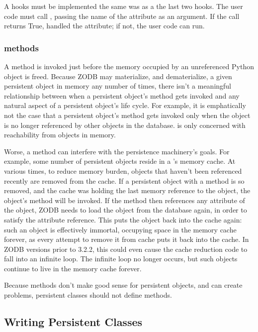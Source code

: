 A  hooks must be implemented the same was as a the
last two hooks.  The user code must call , passing
the name of the attribute as an argument.  If the call returns True,
 handled the attribute; if not, the user code can
run.

\subsubsection{ methods}

A  method is invoked just before the memory occupied by an
unreferenced Python object is freed.  Because ZODB may materialize, and
dematerialize, a given persistent object in memory any number of times,
there isn't a meaningful relationship between when a persistent object's
 method gets invoked and any natural aspect of a
persistent object's life cycle.  For example, it is emphatically not the
case that a persistent object's  method gets invoked only
when the object is no longer referenced by other objects in the database.
 is only concerned with reachability from objects in
memory.

Worse, a  method can interfere with the persistence
machinery's goals.  For example, some number of persistent objects reside
in a 's memory cache.  At various times, to reduce memory
burden, objects that haven't been referenced recently are removed from the
cache.  If a persistent object with a  method is so
removed, and the cache was holding the last memory reference to the object,
the object's  method will be invoked.  If the
 method then references any attribute of the object, ZODB
needs to load the object from the database again, in order to satisfy the
attribute reference.  This puts the object back into the cache again:  such
an object is effectively immortal, occupying space in the memory cache
forever, as every attempt to remove it from cache puts it back into the
cache.  In ZODB versions prior to 3.2.2, this could even cause the cache
reduction code to fall into an infinite loop.  The infinite loop no longer
occurs, but such objects continue to live in the memory cache forever.

Because  methods don't make good sense for persistent
objects, and can create problems, persistent classes should not define
 methods.

\subsection{Writing Persistent Classes}

